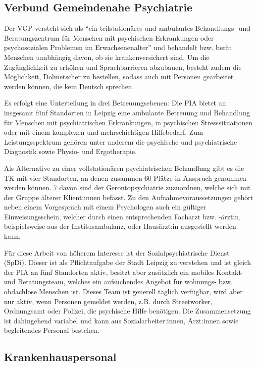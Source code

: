 \subsection{Verbund Gemeindenahe Psychiatrie}

Der \ac{VGP} versteht sich als \enquote{ein teilstationäres und ambulantes Behandlungs- und Beratungszentrum für Menschen mit psychischen Erkrankungen oder	psychosozialen Problemen im Erwachsenenalter} \citep{VGP.2023} und behandelt bzw. berät Menschen unabhängig davon, ob sie krankenversichert sind. Um die Zugänglichkeit zu erhöhen und Sprachbarrieren abzubauen, besteht zudem die Möglichkeit, Dolmetscher zu bestellen, sodass auch mit Personen gearbeitet werden können, die kein Deutsch sprechen.

Es erfolgt eine Unterteilung in drei Betreuungsebenen: Die \ac{PIA} bietet an insgesamt fünf Standorten in Leipzig eine ambulante Betreuung und Behandlung für Menschen mit psychiatrischen Erkrankungen, in psychischen Stresssituationen oder mit einem komplexen und mehrschichtigen Hilfebedarf. Zum Leistungsspektrum gehören unter anderem die psychische und psychiatrische Diagnostik sowie Physio- und Ergotherapie.

Als Alternative zu einer vollstationären psychiatrischen Behandlung gibt es die \ac{TK} mit vier Standorten, an denen zusammen 60 Plätze in Anspruch genommen werden können. 7 davon sind der Gerontopsychiatrie zuzuordnen, welche sich mit der Gruppe älterer Klient:innen befasst. Zu den Aufnahmevoraussetzungen gehört neben einem Vorgespräch mit einem Psychologen auch ein gültiger Einweisungsschein, welcher durch einen entsprechenden Facharzt bzw. -ärztin, beispielsweise aus der Institusambulanz, oder Hausärzt:in ausgestellt werden kann.

Für diese Arbeit von höherem Interesse ist der Sozialpsychiatrische Dienst (\acs{SpDi}). Dieser ist als Pflichtaufgabe der Stadt Leipzig zu verstehen und ist gleich der \ac{PIA} an fünf Standorten aktiv, besitzt aber zusätzlich ein mobiles Kontakt- und Beratungsteam, welches ein aufsuchendes Angebot für wohnungs- bzw. obdachlose Menschen ist. Dieses Team ist generell täglich verfügbar, wird aber nur aktiv, wenn Personen gemeldet werden, z.B. durch Streetworker, Ordnungsamt oder Polizei, die psychische Hilfe benötigen. Die Zusammensetzung ist dahingehend variabel und kann aus Sozialarbeiter:innen, Ärzt:innen sowie begleitendes Personal bestehen.

\subsection{Krankenhauspersonal}

